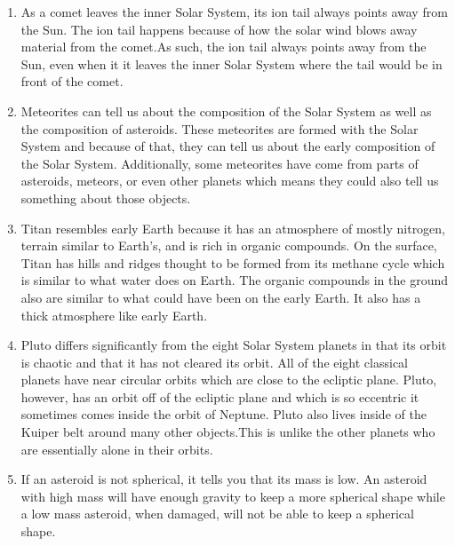 \documentclass[../hw2.tex]{subfiles}
\begin{document}

    \begin{enumerate}
        \item {} As a comet leaves the inner Solar System, its ion tail always points away from the Sun. The ion tail happens because of how the solar wind blows away material from the comet.As such, the ion tail always points away from the Sun, even when it it leaves the inner Solar System where the tail would be in front of the comet. 
        \item {} Meteorites can tell us about the composition of the Solar System as well as the composition of asteroids.  These meteorites are formed with the Solar System and because of that, they can tell us about the early composition of the Solar System. Additionally, some meteorites have come from parts of asteroids, meteors, or even other planets which means they could also tell us something about those objects.
        \item {} Titan resembles early Earth because it has an atmosphere of mostly nitrogen, terrain similar to Earth's, and is rich in organic compounds. On the surface, Titan has hills and ridges thought to be formed from its methane cycle which is similar to what water does on Earth. The organic compounds in the ground also are similar to what could have been on the early Earth. It also has a thick atmosphere like early Earth.
        \item {} Pluto differs significantly from the eight Solar System planets in that its orbit is chaotic and that it has not cleared its orbit. All of the eight classical planets have near circular orbits which are close to the ecliptic plane. Pluto, however, has an orbit off of the ecliptic plane and which is so eccentric it sometimes comes inside the orbit of Neptune. Pluto also lives inside of the Kuiper belt around many other objects.This is unlike the other planets who are essentially alone in their orbits.
        \item {} If an asteroid is not spherical, it tells you that its mass is low. An asteroid with high mass will have enough gravity to keep a more spherical shape while a low mass asteroid, when damaged, will not be able to keep a spherical shape.
    \end{enumerate}
    
\end{document}
